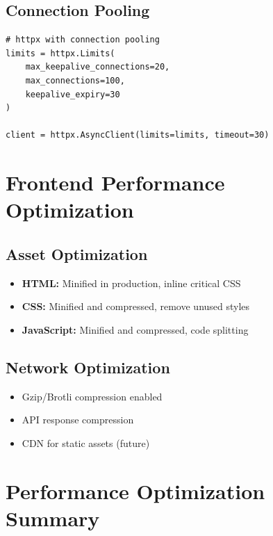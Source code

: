 \documentclass[12pt,a4paper]{report}
\begin{document}
\subsection{Connection Pooling}

\begin{lstlisting}[style=pythonstyle, caption={HTTP Client Configuration}]
# httpx with connection pooling
limits = httpx.Limits(
    max_keepalive_connections=20,
    max_connections=100,
    keepalive_expiry=30
)

client = httpx.AsyncClient(limits=limits, timeout=30)
\end{lstlisting}

\section{Frontend Performance Optimization}

\subsection{Asset Optimization}

\begin{itemize}
    \item \textbf{HTML:} Minified in production, inline critical CSS
    \item \textbf{CSS:} Minified and compressed, remove unused styles
    \item \textbf{JavaScript:} Minified and compressed, code splitting
\end{itemize}

\subsection{Network Optimization}

\begin{itemize}
    \item Gzip/Brotli compression enabled
    \item API response compression
    \item CDN for static assets (future)
\end{itemize}

\section{Performance Optimization Summary}
\end{document}
